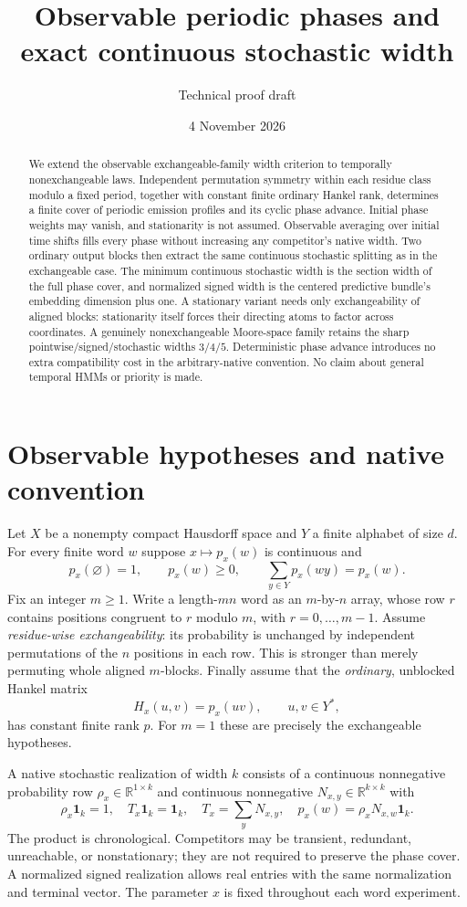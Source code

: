 \documentclass[11pt]{article}
\title{Observable periodic phases and exact continuous stochastic width}
\author{Technical proof draft}
\date{4 November 2026}
\theoremstyle{remark}\newtheorem{remark}[theorem]{Remark}
\newcommand{\R}{\mathbb R}\newcommand{\one}{\mathbf1}
\begin{document}
\maketitle
\begin{abstract}
We extend the observable exchangeable-family width criterion to temporally nonexchangeable laws. Independent permutation symmetry within each residue class modulo a fixed period, together with constant finite ordinary Hankel rank, determines a finite cover of periodic emission profiles and its cyclic phase advance. Initial phase weights may vanish, and stationarity is not assumed. Observable averaging over initial time shifts fills every phase without increasing any competitor's native width. Two ordinary output blocks then extract the same continuous stochastic splitting as in the exchangeable case. The minimum continuous stochastic width is the section width of the full phase cover, and normalized signed width is the centered predictive bundle's embedding dimension plus one. A stationary variant needs only exchangeability of aligned blocks: stationarity itself forces their directing atoms to factor across coordinates. A genuinely nonexchangeable Moore-space family retains the sharp pointwise/signed/stochastic widths $3/4/5$. Deterministic phase advance introduces no extra compatibility cost in the arbitrary-native convention. No claim about general temporal HMMs or priority is made.
\end{abstract}

\section{Observable hypotheses and native convention}
Let $X$ be a nonempty compact Hausdorff space and $Y$ a finite alphabet of size $d$. For every finite word $w$ suppose $x\mapsto p_x(w)$ is continuous and
\[
p_x(\varnothing)=1,\qquad p_x(w)\geq0,\qquad
\sum_{y\in Y}p_x(wy)=p_x(w).
\]
Fix an integer $m\geq1$. Write a length-$mn$ word as an $m$-by-$n$ array, whose row $r$ contains positions congruent to $r$ modulo $m$, with $r=0,\ldots,m-1$. Assume \emph{residue-wise exchangeability}: its probability is unchanged by independent permutations of the $n$ positions in each row. This is stronger than merely permuting whole aligned $m$-blocks. Finally assume that the \emph{ordinary}, unblocked Hankel matrix
\[
H_x(u,v)=p_x(uv),\qquad u,v\in Y^*,
\]
has constant finite rank $p$. For $m=1$ these are precisely the exchangeable hypotheses.

A native stochastic realization of width $k$ consists of a continuous nonnegative probability row $\rho_x\in\R^{1\times k}$ and continuous nonnegative $N_{x,y}\in\R^{k\times k}$ with
\[
\rho_x\one_k=1,\quad T_x\one_k=\one_k,\quad
T_x=\sum_yN_{x,y},\quad p_x(w)=\rho_xN_{x,w}\one_k.
\]
The product is chronological. Competitors may be transient, redundant, unreachable, or nonstationary; they are not required to preserve the phase cover. A normalized signed realization allows real entries with the same normalization and terminal vector. The parameter $x$ is fixed throughout each word experiment.
\end{document}
